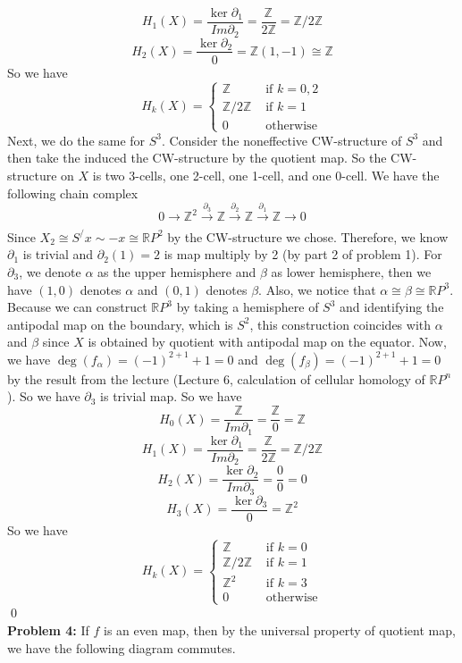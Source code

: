 \documentclass[12pt]{amsart}
\newcommand{\R}{\mathbb{R}}
\newcommand{\Z}{\mathbb{Z}}
\begin{document}
\[H_1(X)=\frac{\ker \partial_1}{Im \partial_2}=\frac{\Z^{}}{2\Z}=\Z/2\Z\]
\[H_2(X)=\frac{\ker \partial_2}{0}=\Z(1,-1)\cong \Z\]
So we have 
\[H_k(X)=\begin{cases}
    \Z & \text{ if }k=0,2\\
    \Z/2\Z &\text{ if }k=1\\
    0&\text{ otherwise}
\end{cases}\]
Next, we do the same for $S^3$. Consider the noneffective CW-structure of $S^3$ and then take the induced the CW-structure by the quotient map. So the CW-structure on $X$ is two 3-cells, one 2-cell, one 1-cell, and one 0-cell. We have the following chain complex 
\[0\to \Z^2\xrightarrow[]{\partial_3}\Z\xrightarrow[]{\partial_2}\Z\xrightarrow[]{\partial_1}\Z\to 0\]
Since $X_2\cong S^/x\sim -x\cong \R P^2$ by the CW-structure we chose. Therefore, we know $\partial_1$ is trivial and $\partial _2(1)=2$ is map multiply by 2 (by part 2 of problem 1). For $\partial_3$, we denote $\alpha$ as the upper hemisphere and $\beta$ as lower hemisphere, then we have $(1,0)$ denotes $\alpha$ and $(0,1)$ denotes $\beta$. Also, we notice that $\alpha\cong \beta\cong \R P^3$. Because we can construct $\R P^3$ by taking a hemisphere of $S^3$ and identifying the antipodal map on the boundary, which is $S^2$, this construction coincides with $\alpha$ and $\beta$ since $X$ is obtained by quotient with antipodal map on the equator. Now, we have $\deg(f_\alpha)=(-1)^{2+1}+1=0$ and $\deg(f_\beta)=(-1)^{2+1}+1=0$ by the result from the lecture (Lecture 6, calculation of cellular homology of $\R P^n$). So we have $\partial_3$ is trivial map. So we have 
\[H_0(X)=\frac{\Z}{Im \partial_1}=\frac{\Z}{0}=\Z\]
\[H_1(X)=\frac{\ker \partial_1}{Im \partial_2}=\frac{\Z^{}}{2\Z}=\Z/2\Z\]
\[H_2(X)=\frac{\ker \partial_2}{Im \partial_3}=\frac{0}{0}=0\]
\[H_3(X)=\frac{\ker \partial_3}{0}=\Z^2\]
So we have 
\[H_k(X)=\begin{cases}
    \Z & \text{ if }k=0\\
    \Z/2\Z &\text{ if }k=1\\
    \Z^2 &\text{ if }k=3\\
    0&\text{ otherwise}
\end{cases}\]
\qed\\
\textbf{Problem 4:} If $f$ is an even map, then by the universal property of quotient map, we have the following diagram commutes.
\begin{center}
\end{center}
\end{document}
